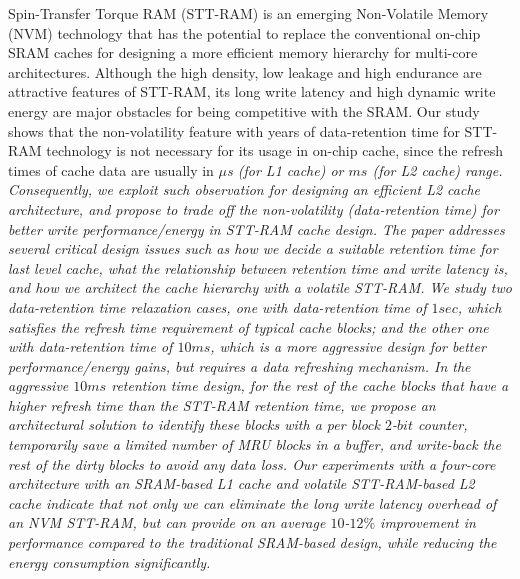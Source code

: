 
Spin-Transfer Torque RAM (STT-RAM) is an emerging Non-Volatile Memory (NVM)
technology that has the potential to replace the conventional
on-chip SRAM caches for designing a more efficient memory hierarchy for
multi-core architectures. Although the high density, low leakage and high endurance are attractive features of STT-RAM,
its long write latency and high dynamic write energy are major obstacles for being competitive with the SRAM.
Our study shows that the non-volatility feature with years of data-retention time for STT-RAM technology is not necessary for its usage in on-chip cache, since the refresh times of cache data are usually in  \it{$\mu$s} (for L1 cache) or $ms$ (for L2 cache) range. Consequently,  we exploit such observation for designing an efficient L2 cache
architecture, and propose to trade off the non-volatility (data-retention time)
for better write performance/energy in STT-RAM cache design. The paper addresses several critical design issues such as how we decide a suitable retention time for last level cache,
what the relationship between retention time and write latency is,
and how we architect the cache hierarchy with a volatile STT-RAM.
We study two
data-retention time relaxation cases, one with data-retention time of  $1sec$, which satisfies the refresh time requirement of typical cache blocks; and the other one with data-retention time of $10ms$, which is a more aggressive design for better performance/energy gains, but requires a data refreshing mechanism.
In the aggressive $10ms$ retention time design, for the rest of the cache blocks that have a higher refresh time
than the STT-RAM retention time, we propose an architectural solution to identify these blocks
with a per block $2$-$bit$ counter, temporarily save a limited number of MRU blocks in a buffer,
and write-back the rest of the dirty blocks to avoid any data loss.
Our experiments with a four-core architecture with an SRAM-based L1 cache and volatile STT-RAM-based L2 cache
indicate that not only we can eliminate the long write latency overhead of an NVM STT-RAM, but can provide
on an average $10$-$12\%$ improvement in performance compared to the traditional SRAM-based
design, while reducing the energy consumption significantly.

